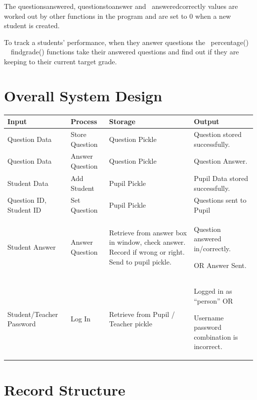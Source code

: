\documentclass[a4paper,12pt]{report}
\begin{document}
\bigskip

The questionsanswered, questionstoanswer and \ answeredcorrectly values are worked out by other functions in the program and are set to 0 when a new student is created.

To track a students' performance, when they answer questions the \ percentage() \ \ findgrade() functions take their answered questions and find out if they are keeping to their current target grade.
\section{Overall System Design}


\bigskip


\bigskip

\begin{flushleft}
\tablefirsthead{}
\tablehead{}
\tabletail{}
\tablelasttail{}
\begin{supertabular}{|m{1.6566598in}|m{1.5955598in}|m{1.6011599in}|m{1.6240599in}|}
\hline
Input &
Process &
Storage &
Output\\\hline
Question Data &
Store Question &
Question Pickle &
Question stored successfully.\\\hline
Question Data &
Answer Question &
Question Pickle &
Question Answer.\\\hline
Student Data &
Add Student &
Pupil Pickle &
Pupil Data stored successfully.\\\hline
Question ID, Student ID &
Set Question &
Pupil Pickle &
Questions sent to Pupil\\\hline
Student Answer &
Answer Question &
Retrieve from answer box in window, check answer. Record if wrong or right. Send to pupil pickle. &
Question answered in/correctly.

OR\newline
Answer Sent.\\\hline
Student/Teacher Password &
Log In &
Retrieve from Pupil / Teacher pickle &
Logged in as ``person''\newline
OR

Username password combination is incorrect.\\\hline
\end{supertabular}
\end{flushleft}

\bigskip


\bigskip

\section{Record Structure}
\end{document}
